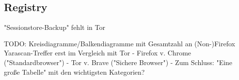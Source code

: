 














\subsection*{Registry}


	
 "Sessionstore-Backup" fehlt in Tor

TODO: Kreisdiagramme/Balkendiagramme mit Gesamtzahl an (Non-)Firefox Yarascan-Treffer erst im Vergleich mit Tor
- Firefox v. Chrome ("Standardbrowser")
- Tor v. Brave ("Sichere Browser")
- Zum Schluss: "Eine große Tabelle" mit den wichtigsten Kategorien?